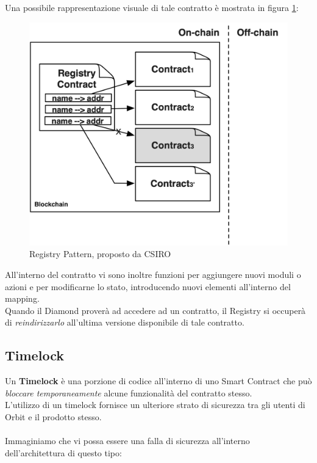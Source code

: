 \documentclass[12pt,a4paper]{report}
\begin{document}
\noindent Una possibile rappresentazione visuale di tale contratto è mostrata in figura \ref{fig:registry_entry}:
\begin{figure}[H]
  \includegraphics[scale=0.28]{registry_entry.png}
  \centering
  \caption{Registry Pattern, proposto da CSIRO\cite{csiro}}
  \label{fig:registry_entry}
\end{figure}
\noindent All'interno del contratto vi sono inoltre funzioni per aggiungere nuovi moduli o azioni e per modificarne lo stato, introducendo nuovi elementi all'interno del mapping.
\\Quando il Diamond proverà ad accedere ad un contratto, il Registry si occuperà di \textit{reindirizzarlo} all'ultima versione disponibile di tale contratto. 

\subsection{Timelock}

Un \textbf{Timelock} è una porzione di codice all'interno di uno Smart Contract che può \textit{bloccare temporaneamente} alcune funzionalità del contratto stesso. \\L'utilizzo di un timelock fornisce un ulteriore strato di sicurezza tra gli utenti di Orbit e il prodotto stesso.
\\\\Immaginiamo che vi possa essere una falla di sicurezza all'interno dell'architettura di questo tipo:
\end{document}
